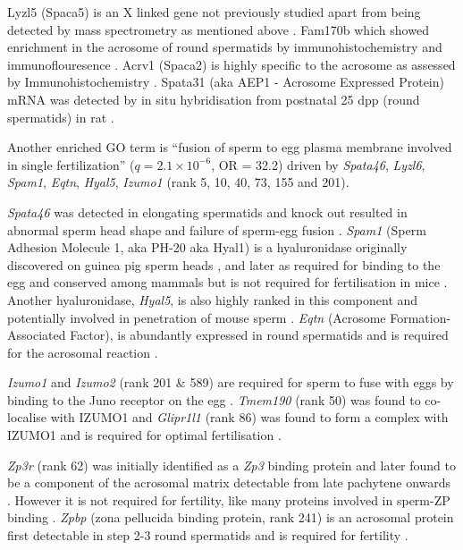 Lyzl5 (Spaca5) is an X linked gene not previously studied apart from being detected by mass spectrometry as mentioned above \parencite{Guyonnet2012Isolation}. Fam170b which showed enrichment in the acrosome of round spermatids by immunohistochemistry and immunoflouresence \parencite{Li2015FAM170B}. Acrv1 (Spaca2) is highly specific to the acrosome as assessed by Immunohistochemistry \parencite{Osuru2014acrosomal}. Spata31 (aka AEP1 - Acrosome Expressed Protein) mRNA was detected by in situ hybridisation from postnatal 25 dpp (round spermatids) in rat \parencite{Luk2006Acrosomespecific}.
 
Another enriched GO term is ``fusion of sperm to egg plasma membrane involved in single fertilization'' ($q = 2.1\times10^{-6}$, OR = 32.2) driven by \textit{Spata46}, \textit{Lyzl6}, \textit{Spam1}, \textit{Eqtn}, \textit{Hyal5}, \textit{Izumo1} (rank 5, 10, 40, 73, 155 and 201).

\textit{Spata46} was detected in elongating spermatids and knock out resulted in abnormal sperm head shape and failure of sperm-egg fusion \parencite{Chen2016Deficiency}. \textit{Spam1} (Sperm Adhesion Molecule 1, aka PH-20 aka Hyal1) is a hyaluronidase originally discovered on guinea pig sperm heads \parencite{Myles1981Surface}, and later as required for binding to the egg \parencite{Primakoff1985role} and conserved among mammals \parencite{Lathrop1990cDNA} but is not required for fertilisation in mice \parencite{Baba2002Mouse}. Another hyaluronidase, \textit{Hyal5}, is also highly ranked in this component and potentially involved in penetration of mouse sperm \parencite{Kim2005Identification, Kimura2009Functional}. \textit{Eqtn} (Acrosome Formation-Associated Factor), is abundantly expressed in round spermatids and is required for the acrosomal reaction \parencite{Li2006Afaf, Hao2014Equatorin}.

\textit{Izumo1} and \textit{Izumo2} (rank 201 \& 589) are required for sperm to fuse with eggs by binding to the Juno receptor on the egg \parencite{Inoue2005immunoglobulin, Bianchi2014Juno}. \textit{Tmem190} (rank 50) was found to co-localise with IZUMO1 \parencite{Nishimura2011Characterization} and \textit{Glipr1l1} (rank 86) was found to form a complex with IZUMO1 and is required for optimal fertilisation \parencite{Gibbs2010Glioma,Gaikwad2019GLIPR1L1}.

\textit{Zp3r} (rank 62) was initially identified as a \textit{Zp3} binding protein \parencite{Bleil1990Identification} and later found to be a component of the acrosomal matrix detectable from late pachytene onwards \parencite{Kim2001Mouse}. However it is not required for fertility, like many proteins involved in sperm-ZP binding \parencite{Muro2012Function}. \textit{Zpbp} (zona pellucida binding protein, rank 241) is an acrosomal protein first detectable in step 2-3 round spermatids and is required for fertility \parencite{Lin2007Loss}.

